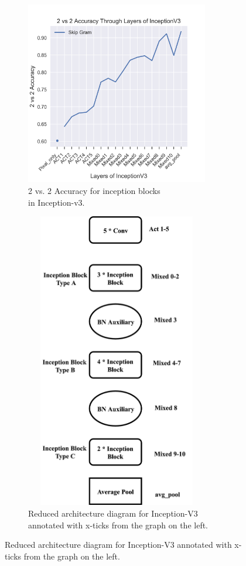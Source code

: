 \begin{figure}[!t]
    \centering
         \begin{subfigure}[t]{0.49\textwidth}
        \includegraphics[width=8cm]{Figures/InceptionV3Mixed}
        \caption{2 vs. 2 Accuracy for inception blocks\\ in Inception-v3.}
    \end{subfigure}%
    \centering
    \begin{subfigure}[t]{0.49\textwidth}
        \includegraphics[width=8cm,height=13cm]{Figures/v3compressed}
        \centering
        \caption{Reduced architecture diagram for Inception-V3 annotated with x-ticks from the graph on the left.}

\end{subfigure}
\end{figure}
